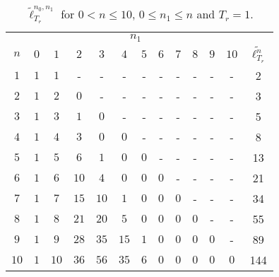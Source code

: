 \documentclass{article}
\begin{document}
    \clearpage

    \begin{table}[!ht]
      \centering
      \begin{tabular}{*{13}{c}}
        \toprule
        & \multicolumn{11}{c}{$n_1$} & \\
        $n$ & $0$ & $1$ & $2$ & $3$ & $4$ & $5$ & $6$ & $7$ & $8$ & $9$ & $10$ & $\tilde{\ell^n_{T_r}}$\\
        \midrule
        $1$ & $1$ & $1$ & - & - & - & - & - & - & - & - & - & 2 \\
        $2$ & $1$ & $2$ & $0$ & - & - & - & - & - & - & - & - & 3 \\
        $3$ & $1$ & $3$ & $1$ & $0$ & - & - & - & - & - & - & - & 5 \\
        $4$ & $1$ & $4$ & $3$ & $0$ & $0$ & - & - & - & - & - & - & 8 \\
        $5$ & $1$ & $5$ & $6$ & $1$ & $0$ & $0$ & - & - & - & - & - & 13 \\
        $6$ & $1$ & $6$ & $10$ & $4$ & $0$ & $0$ & $0$ & - & - & - & - & 21\\
        $7$ & $1$ & $7$ & $15$ & $10$ & $1$ & $0$ & $0$ & $0$ & - & - & - & 34 \\
        $8$ & $1$ & $8$ & $21$ & $20$ & $5$ & $0$ & $0$ & $0$ & $0$ & - & - & 55 \\
        $9$ & $1$ & $9$ & $28$ & $35$ & $15$ & $1$ & $0$ & $0$ & $0$ & $0$ & - & 89 \\
        $10$ & $1$ & $10$ & $36$ & $56$ & $35$ & $6$ & $0$ & $0$ & $0$ & $0$ & $0$ & 144 \\
        \bottomrule
      \end{tabular}
      \caption{$\tilde{\ell}_{T_r}^{n_0,n_1}$ for $0 < n \leq 10$, $0 \leq n_1 \leq n$ and $T_r = 1$.}
      \label{tab:aperiodic_one_spike}
    \end{table}
\end{document}
